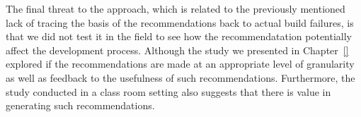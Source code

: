 The final threat to the approach, which is related to the previously mentioned lack of tracing the basis of the recommendations back to actual build failures, is that we did not test it in the field to see how the recommendatation potentially affect the development process.
Although the study we presented in Chapter~\ref{} explored if the recommendations are made at an appropriate level of granularity as well as feedback to the usefulness of such recommendations.
Furthermore, the study conducted in a class room setting also suggests that there is value in generating such recommendations.
